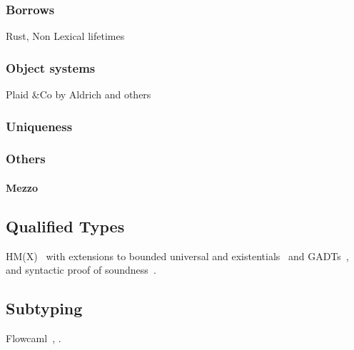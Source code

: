 \subsubsection{Borrows}

Rust, Non Lexical lifetimes

\subsubsection{Object systems}
\TODO{}

Plaid \&Co by Aldrich and others

\subsubsection{Uniqueness}

\subsubsection{Others}

\paragraph{Mezzo}

\subsection{Qualified Types}

HM(X)~\citep{DBLP:journals/tapos/OderskySW99} with extensions to
bounded universal and existentials~\citep{DBLP:conf/icfp/Simonet03}
and GADTs~\citep{DBLP:journals/toplas/SimonetP07},
and syntactic proof of soundness~\citep{DBLP:journals/entcs/SkalkaP02}.

\subsection{Subtyping}



Flowcaml~\citep{DBLP:conf/popl/PottierS02},
\citet{DBLP:conf/sas/TrifonovS96}.


